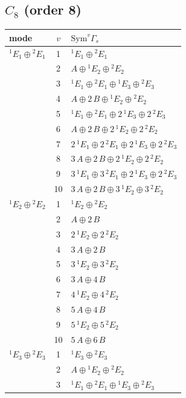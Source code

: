 \documentclass[11pt]{article}
\begin{document}
\subsection*{$C_{8}$ \quad (order 8)}
\begin{longtable}{l c p{}}
\hline mode & $v$ & $\mathrm{Sym}^v\Gamma_s$\\ \hline\endhead
${}^{1}E_{1}\oplus {}^{2}E_{1}$ & 1 & ${}^{1}E_{1}\oplus {}^{2}E_{1}$\\
 & 2 & $A\oplus {}^{1}E_{2}\oplus {}^{2}E_{2}$\\
 & 3 & ${}^{1}E_{1}\oplus {}^{2}E_{1}\oplus {}^{1}E_{3}\oplus {}^{2}E_{3}$\\
 & 4 & $A\oplus 2\,B\oplus {}^{1}E_{2}\oplus {}^{2}E_{2}$\\
 & 5 & ${}^{1}E_{1}\oplus {}^{2}E_{1}\oplus 2\,{}^{1}E_{3}\oplus 2\,{}^{2}E_{3}$\\
 & 6 & $A\oplus 2\,B\oplus 2\,{}^{1}E_{2}\oplus 2\,{}^{2}E_{2}$\\
 & 7 & $2\,{}^{1}E_{1}\oplus 2\,{}^{2}E_{1}\oplus 2\,{}^{1}E_{3}\oplus 2\,{}^{2}E_{3}$\\
 & 8 & $3\,A\oplus 2\,B\oplus 2\,{}^{1}E_{2}\oplus 2\,{}^{2}E_{2}$\\
 & 9 & $3\,{}^{1}E_{1}\oplus 3\,{}^{2}E_{1}\oplus 2\,{}^{1}E_{3}\oplus 2\,{}^{2}E_{3}$\\
 & 10 & $3\,A\oplus 2\,B\oplus 3\,{}^{1}E_{2}\oplus 3\,{}^{2}E_{2}$\\
\hline
${}^{1}E_{2}\oplus {}^{2}E_{2}$ & 1 & ${}^{1}E_{2}\oplus {}^{2}E_{2}$\\
 & 2 & $A\oplus 2\,B$\\
 & 3 & $2\,{}^{1}E_{2}\oplus 2\,{}^{2}E_{2}$\\
 & 4 & $3\,A\oplus 2\,B$\\
 & 5 & $3\,{}^{1}E_{2}\oplus 3\,{}^{2}E_{2}$\\
 & 6 & $3\,A\oplus 4\,B$\\
 & 7 & $4\,{}^{1}E_{2}\oplus 4\,{}^{2}E_{2}$\\
 & 8 & $5\,A\oplus 4\,B$\\
 & 9 & $5\,{}^{1}E_{2}\oplus 5\,{}^{2}E_{2}$\\
 & 10 & $5\,A\oplus 6\,B$\\
\hline
${}^{1}E_{3}\oplus {}^{2}E_{3}$ & 1 & ${}^{1}E_{3}\oplus {}^{2}E_{3}$\\
 & 2 & $A\oplus {}^{1}E_{2}\oplus {}^{2}E_{2}$\\
 & 3 & ${}^{1}E_{1}\oplus {}^{2}E_{1}\oplus {}^{1}E_{3}\oplus {}^{2}E_{3}$\\

\end{longtable}
\end{document}
